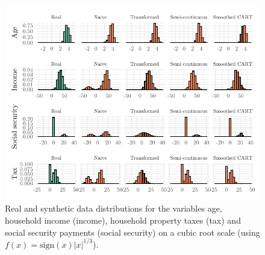 \documentclass[
]{template/style/uneceart}
\begin{document}
\begin{figure}[t]

{\centering \includegraphics[width=1\textwidth,height=\textheight]{dr-utility-volker-kesteren_files/figure-pdf/fig-syn-dist-1.pdf}

}

\caption{\label{fig-syn-dist}Real and synthetic data distributions for
the variables age, household income (income), household property taxes
(tax) and social security payments (social security) on a cubic root
scale (using \(f(x) = \text{sign}(x)|x|^{1/3}\)).}

\end{figure}
\end{document}
